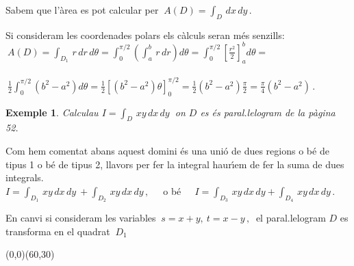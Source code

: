 \documentclass[12pt]{article}
\newtheorem{exemple}{Exemple}[subsection]
\begin{document}
\vspace*{1cm}

Sabem que l'{\`a}rea es pot calcular per $\ \displaystyle
A(D)=\int_D\,dx\,dy\,.$

Si consideram les coordenades polars els c{\`a}lculs seran m{\'e}s
senzills:\\

\hspace*{1cm}$\ \displaystyle
A(D)=\int_{D_1}\,r\,dr\,d\theta=\int_0^{\pi/2}\left(
\int_a^b\,r\,dr\right)d\theta=
\int_0^{\pi/2}\left[\frac{r^2}{2}\right]_a^b d\theta=$\\\\

\hspace*{1cm}$\
\displaystyle\frac{1}{2}\int_0^{\pi/2}(b^2-a^2)d\theta
=\frac{1}{2}\left[(b^2-a^2)\theta\right]_0^{\pi/2}=\frac{1}{2}(b^2-a^2)\frac{\pi}{2}
=\frac{\pi}{4}(b^2-a^2)\,.$\\

\vspace{0.4cm}
\begin{exemple}
Calculau  $I=\displaystyle\int_D\, xy\,dx\,dy\ $ on $D$ es {\'e}s
paral.lelogram de la p{\`a}gina 52.
\end{exemple}

Com hem comentat abans aquest domini {\'e}s una uni{\'o} de dues regions o
b{\'e} de tipus 1 o b{\'e} de tipus 2, llavors per fer la integral haur{\'\i}em
de fer la suma de dues integrals.\\

\hspace*{1cm} $I=\displaystyle\int_{D_1}\, xy\,dx\,dy\ +\int_{D_2}\,
xy\,dx\,dy\,,\ \ \ \ \ $ o b{\'e} $\ \ \ \ \ \displaystyle
I=\int_{D_3}\, xy\,dx\,dy+\int_{D_4}\, xy\,dx\,dy\,. $


En canvi si consideram les variables $\ s=x+y,\ t=x-y\,,\ $ el
paral.lelogram $D$ es transforma en el quadrat $\ D_1\ $


\vspace*{1.cm}
\begin{center}
\begin{picture}(0,0)(60,30)
\end{picture}
\end{center}
\end{document}
